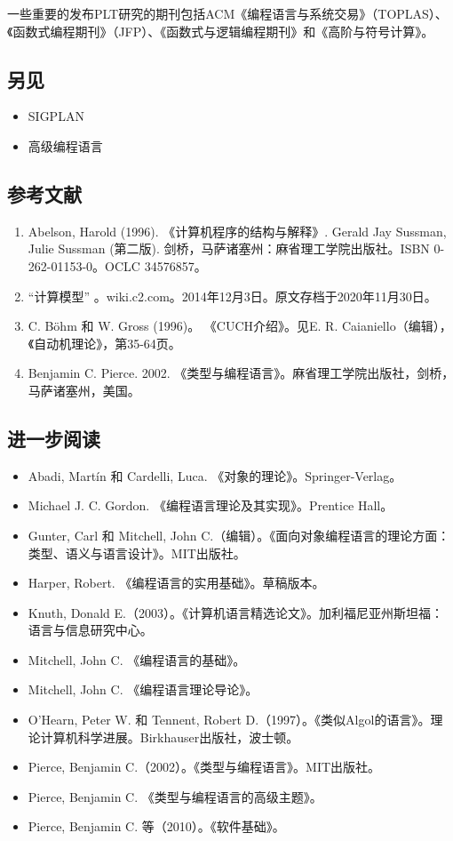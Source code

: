 一些重要的发布PLT研究的期刊包括ACM《编程语言与系统交易》（TOPLAS）、《函数式编程期刊》（JFP）、《函数式与逻辑编程期刊》和《高阶与符号计算》。
\subsection{另见}  
\begin{itemize}
\item SIGPLAN  
\item 高级编程语言
\end{itemize}
\subsection{参考文献}  
\begin{enumerate}
\item Abelson, Harold (1996). 《计算机程序的结构与解释》. Gerald Jay Sussman, Julie Sussman (第二版). 剑桥，马萨诸塞州：麻省理工学院出版社。ISBN 0-262-01153-0。OCLC 34576857。  
\item “计算模型” 。wiki.c2.com。2014年12月3日。原文存档于2020年11月30日。  
\item C. Böhm 和 W. Gross (1996)。 《CUCH介绍》。见E. R. Caianiello（编辑），《自动机理论》，第35-64页。  
\item Benjamin C. Pierce. 2002. 《类型与编程语言》。麻省理工学院出版社，剑桥，马萨诸塞州，美国。
\end{enumerate}
\subsection{进一步阅读}  
\begin{itemize}
\item Abadi, Martín 和 Cardelli, Luca. 《对象的理论》。Springer-Verlag。  
\item Michael J. C. Gordon. 《编程语言理论及其实现》。Prentice Hall。  
\item Gunter, Carl 和 Mitchell, John C.（编辑）。《面向对象编程语言的理论方面：类型、语义与语言设计》。MIT出版社。  
\item Harper, Robert. 《编程语言的实用基础》。草稿版本。  
\item Knuth, Donald E.（2003）。《计算机语言精选论文》。加利福尼亚州斯坦福：语言与信息研究中心。  
\item Mitchell, John C. 《编程语言的基础》。  
\item Mitchell, John C. 《编程语言理论导论》。  
\item O'Hearn, Peter W. 和 Tennent, Robert D.（1997）。《类似Algol的语言》。理论计算机科学进展。Birkhauser出版社，波士顿。  
\item Pierce, Benjamin C.（2002）。《类型与编程语言》。MIT出版社。  
\item Pierce, Benjamin C. 《类型与编程语言的高级主题》。  
\item Pierce, Benjamin C. 等（2010）。《软件基础》。
\end{itemize}
